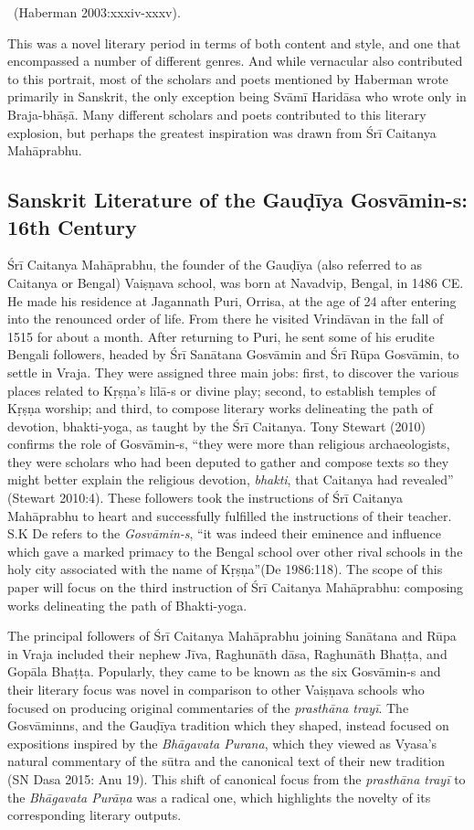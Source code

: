 \begin{myquote}
~\hfill(Haberman 2003:xxxiv-xxxv). 
\end{myquote}

This was a novel literary period in terms of both content and style, and one that encompassed a number of different genres. And while vernacular also contributed to this portrait, most of the scholars and poets mentioned by Haberman wrote primarily in Sanskrit, the only exception being Svāmī Haridāsa who wrote only in Braja-bhāṣā. Many different scholars and poets contributed to this literary explosion, but perhaps the greatest inspiration was drawn from Śrī Caitanya Mahāprabhu. 

\subsection*{Sanskrit Literature of the Gauḍīya Gosvāmin-s: 16th Century}

Śrī Caitanya Mahāprabhu, the founder of the Gauḍīya (also referred to as Caitanya or Bengal) Vaiṣṇava school, was born at Navadvip, Bengal, in 1486 CE. He made his residence at Jagannath Puri, Orrisa, at the age of 24 after entering into the renounced order of life. From there he visited Vrindāvan in the fall of 1515 for about a month. After returning to Puri, he sent some of his erudite Bengali followers, headed by Śrī Sanātana Gosvāmin and Śrī Rūpa Gosvāmin, to settle in Vraja. They were assigned three main jobs: first, to discover the various places related to Kṛṣṇa’s līlā-s or divine play; second, to establish temples of Kṛṣṇa worship; and third, to compose literary works delineating the path of devotion, bhakti-yoga, as taught by the Śrī Caitanya. Tony Stewart (2010) confirms the role of Gosvāmin-s, “they were more than religious archaeologists, they were scholars who had been deputed to gather and compose texts so they might better explain the religious devotion, {\sl bhakti}, that Caitanya had revealed” (Stewart 2010:4). These followers took the instructions of Śrī Caitanya Mahāprabhu to heart and successfully fulfilled the instructions of their teacher. S.K De refers to the {\sl Gosvāmin-s}, “it was indeed their eminence and influence which gave a marked primacy to the Bengal school over other rival schools in the holy city associated with the name of Kṛṣṇa”(De 1986:118). The scope of this paper will focus on the third instruction of Śrī Caitanya Mahāprabhu: composing works delineating the path of Bhakti-yoga. 

The principal followers of Śrī Caitanya Mahāprabhu joining Sanātana and Rūpa in Vraja included their nephew Jīva, Raghunāth dāsa, Raghunāth Bhaṭṭa, and Gopāla Bhaṭṭa. Popularly, they came to be known as the six Gosvāmin-s and their literary focus was novel in comparison to other Vaiṣṇava schools who focused on producing original commentaries of the {\sl prasthāna trayī}. The Gosvāminns, and the Gauḍīya tradition which they shaped, instead focused on expositions inspired by the {\sl Bhāgavata Purana}, which they viewed as Vyasa’s natural commentary of the sūtra and the canonical text of their new tradition (SN Dasa 2015: Anu 19). This shift of canonical focus from the {\sl prasthāna trayī} to the {\sl Bhāgavata Purāṇa} was a radical one, which highlights the novelty of its corresponding literary outputs. 

